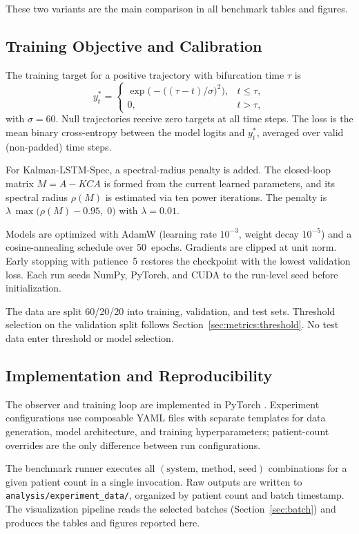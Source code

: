 These two variants are the main comparison in all benchmark tables and figures.

\subsection{Training Objective and Calibration}
\label{sec:methods:training}

The training target for a positive trajectory with bifurcation time \(\tau\) is
\[
  y_t^{*} =
  \begin{cases}
    \exp\!\bigl(-\bigl((\tau - t)/\sigma\bigr)^2\bigr), & t \leq \tau, \\[4pt]
    0, & t > \tau,
  \end{cases}
\]
with \(\sigma = 60\). Null trajectories receive zero targets at all time steps.
The loss is the mean binary cross-entropy between the model logits and
\(y_t^{*}\), averaged over valid (non-padded) time steps.

For Kalman-LSTM-Spec, a spectral-radius penalty is added. The closed-loop
matrix \(M = A - KCA\) is formed from the current learned parameters, and its
spectral radius \(\rho(M)\) is estimated via ten power iterations. The penalty
is \(\lambda\,\max\bigl(\rho(M) - 0.95,\; 0\bigr)\) with \(\lambda = 0.01\).

Models are optimized with AdamW \citep{loshchilov2019decoupled} (learning rate \(10^{-3}\), weight decay
\(10^{-5}\)) and a cosine-annealing schedule \citep{loshchilov2017sgdr} over 50~epochs. Gradients are
clipped at unit norm. Early stopping with patience~5 restores the checkpoint
with the lowest validation loss. Each run seeds NumPy, PyTorch, and CUDA to the
run-level seed before initialization.

The data are split 60/20/20 into training, validation, and test sets. Threshold
selection on the validation split follows Section~\ref{sec:metrics:threshold}.
No test data enter threshold or model selection.

\subsection{Implementation and Reproducibility}
\label{sec:methods:implementation}

The observer and training loop are implemented in PyTorch \citep{paszke2019pytorch}. Experiment
configurations use composable YAML files with separate templates for data
generation, model architecture, and training hyperparameters; patient-count
overrides are the only difference between run configurations.

The benchmark runner executes all \((\text{system},\, \text{method},\,
\text{seed})\) combinations for a given patient count in a single invocation.
Raw outputs are written to \texttt{analysis/experiment\_data/}, organized by
patient count and batch timestamp. The visualization pipeline reads the selected
batches (Section~\ref{sec:batch}) and produces the tables and figures reported
here.
